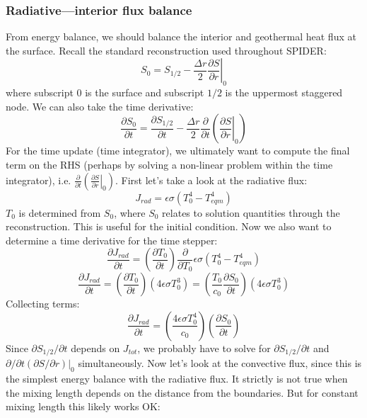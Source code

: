 \subsubsection{Radiative---interior flux balance}
From energy balance, we should balance the interior and geothermal heat flux at the surface.  Recall the standard reconstruction used throughout SPIDER:
\begin{equation}
S_0 = S_{1/2} - \frac{\Delta r}{2} \left.\frac{\partial S}{\partial r}\right|_0
\end{equation}
where subscript 0 is the surface and subscript $1/2$ is the uppermost staggered node.  We can also take the time derivative:
\begin{equation}
\frac{\partial S_0}{\partial t} = \frac{\partial S_{1/2}}{\partial t} - \frac{\Delta r}{2} \frac{\partial}{\partial t} \left( \left. \frac{\partial S}{\partial r}\right|_0 \right)
\end{equation}
For the time update (time integrator), we ultimately want to compute the final term on the RHS (perhaps by solving a non-linear problem within the time integrator), i.e. $\frac{\partial}{\partial t} \left( \left. \frac{\partial S}{\partial r}\right|_0 \right)$.  First let's take a look at the radiative flux:
\begin{equation}
J_{rad} = \epsilon \sigma (T_0^4 - T_{eqm}^4)
\end{equation}
$T_0$ is determined from $S_0$, where $S_0$ relates to solution quantities through the reconstruction.  This is useful for the initial condition.  Now we also want to determine a time derivative for the time stepper:
\begin{equation}
\frac{\partial J_{rad}}{\partial t} = \left(\frac{\partial T_0}{\partial t}\right) \frac{\partial}{\partial T_0} \epsilon \sigma (T_0^4 - T_{eqm}^4)
\end{equation}
\begin{equation}
\frac{\partial J_{rad}}{\partial t} = \left(\frac{\partial T_0}{\partial t}\right) \left(4 \epsilon \sigma T_0^3\right) = \left( \frac{T_0}{c_0} \frac{\partial S_0}{\partial t} \right) (4 \epsilon \sigma T_0^3)
\end{equation}
Collecting terms:
\begin{equation}
\frac{\partial J_{rad}}{\partial t} = \left( \frac{4 \epsilon \sigma T_0^4}{c_0} \right) \left(\frac{\partial S_0}{\partial t} \right)
\end{equation}
Since $\partial S_{1/2} / \partial t$ depends on $J_{tot}$, we probably have to solve for $\partial S_{1/2} / \partial t$ and $\partial / \partial t (\partial S/\partial r)|_0$ simultaneously.  Now let's look at the convective flux, since this is the simplest energy balance with the radiative flux.  It strictly is not true when the mixing length depends on the distance from the boundaries.  But for constant mixing length this likely works OK:
